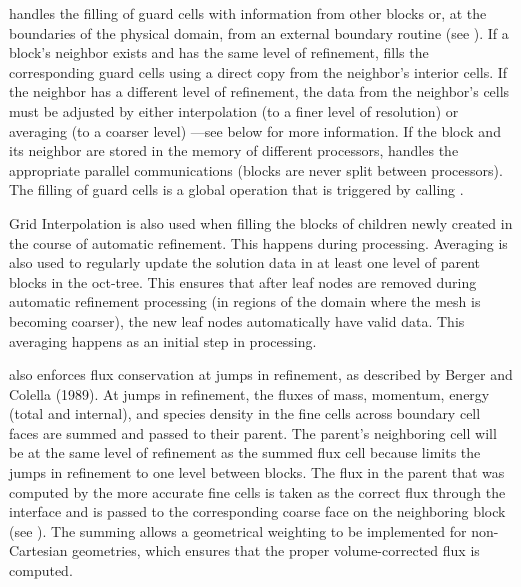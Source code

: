 \Paramesh handles the filling of guard cells with information from
other blocks or, at the boundaries of the physical domain, from an
external boundary routine (see ).
If a block's neighbor exists and has the same level of refinement,
\Paramesh fills the corresponding guard cells using a direct copy from
the neighbor's interior cells. If the neighbor has a different level
of refinement, the data from the neighbor's cells must be adjusted by
either interpolation%
(to a finer level of
resolution) or averaging (to a coarser level)%
---see  below for more information.
If the block and its neighbor are stored in the memory of
different processors, \Paramesh handles the appropriate parallel
communications (blocks are never split between processors).
The filling of guard cells is a global operation that is
triggered by calling .

Grid Interpolation%
is also used when filling
the blocks of children newly created in the course of automatic
refinement. This happens during 
processing. Averaging%
is also used 
to regularly update the solution data in at least one level of parent
blocks in the oct-tree. This ensures that after leaf nodes are
removed during automatic refinement processing (in regions of the
domain where the mesh is becoming coarser), the new leaf nodes
automatically have valid data.
This averaging happens as an initial step in
 processing.

\Paramesh also enforces flux conservation %
at jumps
in refinement, as described by Berger and Colella (1989).  At jumps
in refinement, the fluxes of mass, momentum, energy (total and
internal), and species density in the fine cells across boundary
cell faces are summed and passed to their parent.  The parent's
neighboring cell will be at the same level of refinement as the summed
flux cell because \Paramesh limits the jumps in refinement to one level
between 
blocks.  The flux in the parent that was computed by the more
accurate fine cells is taken as the correct flux through the
interface and is passed to the corresponding coarse face on the
neighboring block (see ). The
summing allows a geometrical weighting to be implemented for
non-Cartesian geometries, which ensures that the proper volume-corrected
flux is computed.

